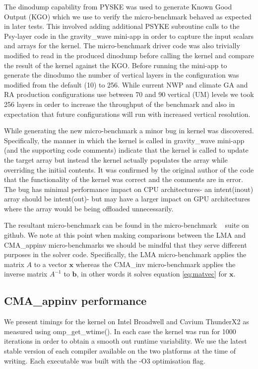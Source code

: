 The dinodump capability from PYSKE was used to generate Known Good Output (KGO) which we use to verify the micro-benchmark behaved as expected in later tests.
This involved adding additional PSYKE subroutine calls to the Psy-layer code in the gravity\_wave mini-app in order to capture the input scalars and arrays for the kernel.
The micro-benchmark driver code was also trivially modified to read in the produced dinodump before calling the kernel and compare the result of the kernel against the KGO.
Before running the mini-app to generate the dinodumo the number of vertical layers in the configuration was modified from the default (10) to 256.
While current NWP and climate GA and RA production configurations use between 70 and 90 vertical (UM) levels we took 256 layers in order to increase the throughput of the benchmark and also in expectation that future configurations will run with increased vertical resolution.


While generating the new micro-benchmark a minor bug in kernel was discovered.
Specifically, the manner in which the kernel is called in gravity\_wave mini-app (and the supporting code comments) indicate that the kernel is called to update the target array but instead the kernel actually populates the array while overriding the initial contents.
It was confirmed by the original author of the code that the functionality of the kernel was correct and the comments are in error.
The bug has minimal performance impact on CPU architectures- an intent(inout) array should be intent(out)- but may have a larger impact on GPU architectures where the array would be being offloaded unnecessarily. 

The resultant micro-benchmark can be found in the micro-benchmark ~\cite{lfric-microbenchmarks} suite on github.
We note at this point when making comparisons between the LMA and CMA\_appinv micro-benchmarks we should be mindful that they serve different purposes in the solver code.
Specifically, the LMA micro-benchmark applies the matrix $A$ to a vector $\mathbf{x}$ whereas the CMA\_inv micro-benchmark applies the inverse matrix $A^{-1}$ to $\mathbf{b}$, in other words it solves equation \ref{eq:matvec} for $\mathbf{x}$.

\subsection{CMA\_appinv performance}

We present timings for the kernel on Intel Broadwell and Cavium ThunderX2 as measured using omp\_get\_wtime().
In each case the kernel was run for 1000 iterations in order to obtain a smooth out runtime variability.
We use the latest stable version of each compiler available on the two platforms at the time of writing.
Each executable was built with the -O3 optimisation flag.

